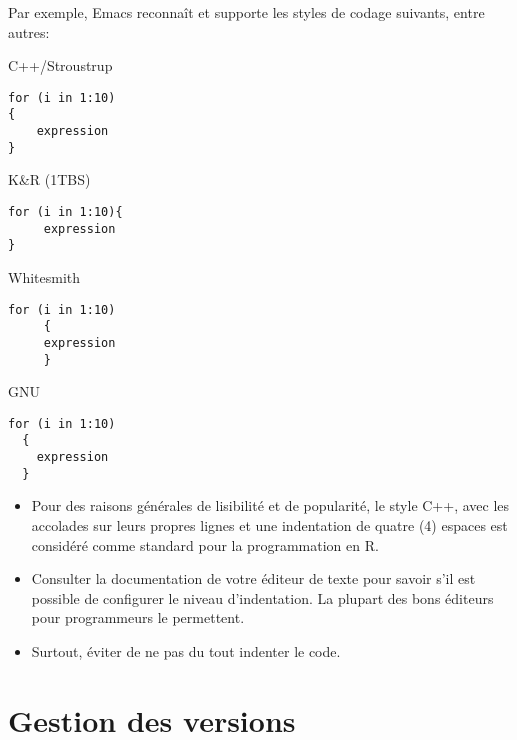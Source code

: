 Par exemple, Emacs reconnaît et supporte les styles de
codage suivants, entre autres:
\begin{center}
  \begin{minipage}[t]{9cm}
    C++/Stroustrup
    \hfill
    \begin{minipage}[t]{5cm}
\begin{verbatim}
for (i in 1:10)
{
    expression
}
\end{verbatim}
    \end{minipage}
  \end{minipage}
  \vspace{\baselineskip}

  \begin{minipage}[t]{9cm}
    K\&R (1TBS)
    \hfill
    \begin{minipage}[t]{5cm}
\begin{verbatim}
for (i in 1:10){
     expression
}
\end{verbatim}
    \end{minipage}
  \end{minipage}
  \vspace{\baselineskip}

  \begin{minipage}[t]{9cm}
    Whitesmith
    \hfill
    \begin{minipage}[t]{5cm}
\begin{verbatim}
for (i in 1:10)
     {
     expression
     }
\end{verbatim}
    \end{minipage}
  \end{minipage}
  \vspace{\baselineskip}

  \begin{minipage}[t]{9cm}
    GNU
    \hfill
    \begin{minipage}[t]{5cm}
\begin{verbatim}
for (i in 1:10)
  {
    expression
  }
\end{verbatim}
    \end{minipage}
  \end{minipage}
\end{center}

\begin{itemize}
\item Pour des raisons générales de lisibilité et de popularité, le
  style C++, avec les accolades sur leurs propres lignes et une
  indentation de quatre (4) espaces est considéré comme standard pour
  la programmation en R.
\item Consulter la documentation de votre éditeur de texte pour savoir
  s'il est possible de configurer le niveau d'indentation. La plupart des
  bons éditeurs pour programmeurs le permettent.
\item Surtout, éviter de ne pas du tout indenter le code.
\end{itemize}


\section{Gestion des versions}
\label{sec:collaboration:git}



